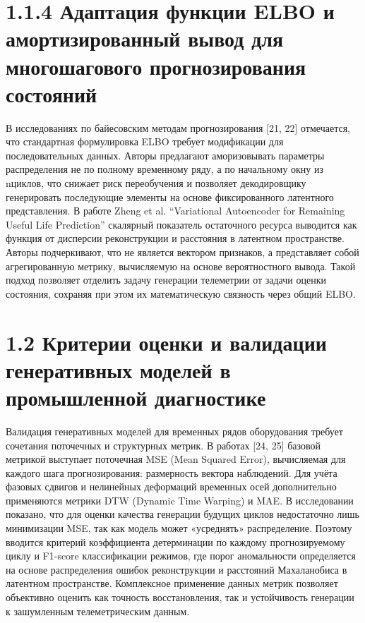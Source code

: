 \documentclass[14pt, a4paper, oneside]{extreport}
\begin{document}
\vspace{1em}
\section{1.1.4 Адаптация функции ELBO и амортизированный вывод для многошагового прогнозирования состояний}
\vspace{1em}
В исследованиях по байесовским методам прогнозирования [21, 22] отмечается, что стандартная формулировка ELBO требует модификации для последовательных данных. Авторы предлагают аморизовывать параметры распределения не по полному временному ряду, а по начальному окну из nциклов, что снижает риск переобучения и позволяет декодировщику генерировать последующие элементы на основе фиксированного латентного представления.
В работе Zheng et al. “Variational Autoencoder for Remaining Useful Life Prediction” скалярный показатель остаточного ресурса выводится как функция от дисперсии реконструкции и расстояния в латентном пространстве. Авторы подчеркивают, что не является вектором признаков, а представляет собой агрегированную метрику, вычисляемую на основе вероятностного вывода. Такой подход позволяет отделить задачу генерации телеметрии от задачи оценки состояния, сохраняя при этом их математическую связность через общий ELBO.

\vspace{1em}
\section{1.2 Критерии оценки и валидации генеративных моделей в промышленной диагностике}
\vspace{1em}
Валидация генеративных моделей для временных рядов оборудования требует сочетания поточечных и структурных метрик. В работах [24, 25] базовой метрикой выступает поточечная MSE (Mean Squared Error), вычисляемая для каждого шага прогнозирования: размерность вектора наблюдений. Для учёта фазовых сдвигов и нелинейных деформаций временных осей дополнительно применяются метрики DTW (Dynamic Time Warping) и MAE.
В исследовании показано, что для оценки качества генерации будущих циклов недостаточно лишь минимизации MSE, так как модель может «усреднять» распределение. Поэтому вводится критерий коэффициента детерминации по каждому прогнозируемому циклу и F1-score классификации режимов, где порог аномальности определяется на основе распределения ошибок реконструкции и расстояний Махаланобиса в латентном пространстве. Комплексное применение данных метрик позволяет объективно оценить как точность восстановления, так и устойчивость генерации к зашумленным телеметрическим данным.
\end{document}
